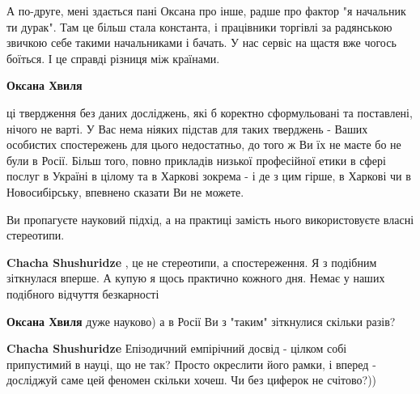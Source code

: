 \begin{itemize}
\begin{itemize}
А по-друге, мені здається пані Оксана про інше, радше про фактор "я начальник
ти дурак". Там це більш стала константа, і працівники торгівлі за радянською
звичкою себе такими начальниками і бачать. У нас сервіс на щастя вже чогось
боїться. І це справді різниця між країнами.

 
\textbf{Оксана Хвиля} 

ці твердження без даних досліджень, які б коректно сформульовані та поставлені,
нічого не варті. У Вас нема ніяких підстав для таких тверджень - Ваших
особистих спостережень для цього недостатньо, до того ж Ви їх не маєте бо не
були в Росії. Більш того, повно прикладів низької професійної етики в сфері
послуг в Україні в цілому та в Харкові зокрема - і де з цим гірше, в Харкові чи
в Новосибірську, впевнено сказати Ви не можете.

Ви пропагуєте науковий підхід, а на практиці замість нього використовуєте
власні стереотипи.


 
\textbf{Chacha Shushuridze} , це не стереотипи, а спостереження. Я з подібним
зіткнулася вперше. А купую я щось практично кожного дня. Немає у наших
подібного відчуття безкарності

 
\textbf{Оксана Хвиля} дуже науково) а в Росії Ви з "таким" зіткнулися скільки разів?

 
\textbf{Chacha Shushuridze} Епізодичний емпірічний досвід - цілком собі
припустимий в науці, що не так? Просто окреслити його рамки, і вперед -
досліджуй саме цей феномен скільки хочеш. Чи без циферок не счітово?))


\end{itemize}
\end{itemize}
